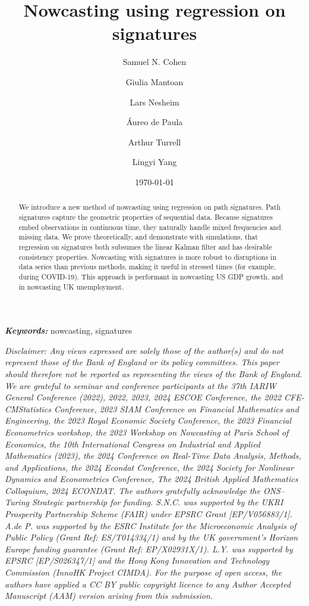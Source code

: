 \documentclass[a4paper, 12pt]{article}
\title{Nowcasting using regression on signatures}
\author[1,2]{Samuel N. Cohen}
\author[3]{Giulia Mantoan}
\author[2,4,5]{Lars Nesheim}
\author[4,6]{\'{A}ureo de Paula}
\author[7]{Arthur Turrell}
\author[8,9]{Lingyi Yang}
\affil[1]{University of Oxford}
\affil[2]{The Alan Turing Institute}
\affil[3]{Bank of England}
\affil[4]{University College London, Cemmap and Institute for Fiscal Studies}
\affil[5]{University of Bristol}
\affil[6]{CEPR}
\affil[7]{Google}
\affil[8]{University of Nottingham}
\affil[9]{Continuous Intelligence}
\date{\today}
\theoremstyle{remark}
\providecommand{\keywords}[1]
{
  \small	
  \textbf{\textit{Keywords:}} #1
}
\begin{document}
\maketitle

\begin{abstract}
\footnotesize
\noindent We introduce a new method of nowcasting using regression on path signatures. Path signatures capture the geometric properties of sequential data. Because signatures embed observations in continuous time, they naturally handle mixed frequencies and missing data. We prove theoretically, and demonstrate with simulations, that regression on signatures both subsumes the linear Kalman filter and has desirable consistency properties. Nowcasting with signatures is more robust to disruptions in data series than previous methods, making it useful in stressed times (for example, during COVID-19). This approach is performant in nowcasting US GDP growth, and in nowcasting UK unemployment.
\end{abstract}

\keywords{nowcasting, signatures}

\vspace{1em}
{\noindent \textit{\scriptsize{Disclaimer: 
Any views expressed are solely those of the author(s) and do not represent those of the Bank of England or its policy committees. This paper should therefore not be reported as representing the views of the Bank of England. We are grateful to seminar and conference participants at the 37th IARIW General Conference (2022), 2022, 2023, 2024 ESCOE Conference, the 2022 CFE-CMStatistics Conference, 2023 SIAM Conference on Financial Mathematics and Engineering, the 2023 Royal Economic Society Conference, the 2023 Financial Econometrics workshop, the 2023 Workshop on Nowcasting at Paris School of Economics, the 10th International Congress on Industrial and Applied Mathematics (2023), the 2024 Conference on Real-Time Data Analysis, Methods, and Applications, the 2024 Econdat Conference, the 2024 Society for Nonlinear Dynamics and Econometrics Conference, The 2024 British Applied Mathematics Colloquium, 2024 ECONDAT.
The authors gratefully acknowledge the ONS--Turing Strategic partnership for funding.
S.N.C. was supported by the UKRI Prosperity Partnership Scheme (FAIR) under EPSRC Grant [EP/V056883/1].  A.de P. was supported by the ESRC Institute for the Microeconomic Analysis of Public Policy (Grant Ref: ES/T014334/1) and by the UK government’s Horizon Europe funding guarantee (Grant Ref: EP/X02931X/1).  L.Y. was supported by EPSRC [EP/S026347/1] and the Hong Kong Innovation and Technology Commission (InnoHK Project CIMDA). 
For the purpose of open access, the authors have applied a CC BY public copyright licence to any Author Accepted Manuscript (AAM) version arising from this submission.
}}}
\end{document}
